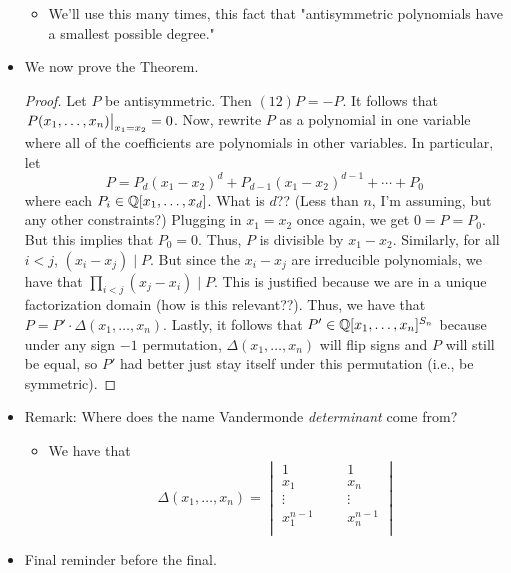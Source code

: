 \documentclass[../notes.tex]{subfiles}
\begin{document}
\begin{itemize}
\begin{itemize}
        \item We'll use this many times, this fact that "antisymmetric polynomials have a smallest possible degree."
    \end{itemize}
    \item We now prove the Theorem.
    \begin{proof}
        Let $P$ be antisymmetric. Then $(12)P=-P$. It follows that $\eval{P(x_1,\dots,x_n)}_{x_1=x_2}=0$. Now, rewrite $P$ as a polynomial in one variable where all of the coefficients are polynomials in other variables. In particular, let
        \begin{equation*}
            P = P_d(x_1-x_2)^d+P_{d-1}(x_1-x_2)^{d-1}+\cdots+P_0
        \end{equation*}
        where each $P_i\in\mathbb{Q}[x_1,\dots,x_d]$. What is $d$?? (Less than $n$, I'm assuming, but any other constraints?) Plugging in $x_1=x_2$ once again, we get $0=P=P_0$. But this implies that $P_0=0$. Thus, $P$ is divisible by $x_1-x_2$. Similarly, for all $i<j$, $(x_i-x_j)\mid P$. But since the $x_i-x_j$ are irreducible polynomials, we have that $\prod_{i<j}(x_j-x_i)\mid P$. This is justified because we are in a unique factorization domain (how is this relevant??). Thus, we have that $P=P'\cdot\Delta(x_1,\dots,x_n)$. Lastly, it follows that $P'\in\mathbb{Q}[x_1,\dots,x_n]^{S_n}$ because under any sign $-1$ permutation, $\Delta(x_1,\dots,x_n)$ will flip signs and $P$ will still be equal, so $P'$ had better just stay itself under this permutation (i.e., be symmetric).
    \end{proof}
    \item Remark: Where does the name Vandermonde \emph{determinant} come from?
    \begin{itemize}
        \item We have that
        \begin{equation*}
            \Delta(x_1,\dots,x_n) =
            \begin{vmatrix}
                1 &  &  & 1\\
                x_1 &  &  & x_n\\
                \vdots &  &  & \vdots\\
                x_1^{n-1} &  &  & x_n^{n-1}\\
            \end{vmatrix}
        \end{equation*}
    \end{itemize}
    \item Final reminder before the final.

\end{itemize}
\end{document}
